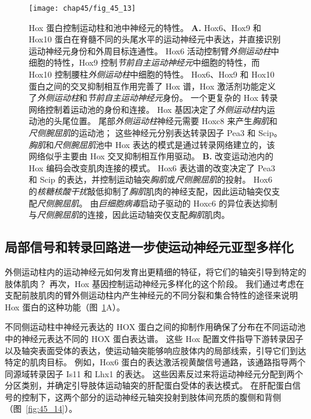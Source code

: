 \begin{figure}[htbp]
	\centering
	\texttt{[image: chap45/fig\_45\_13]}
	\caption{Hox 蛋白控制运动柱和池中神经元的特性\cite{dasen2005hox}。
		\textbf{A.} Hox6、Hox9 和 Hox10 蛋白在脊髓不同的头尾水平的运动神经元中表达，并直接识别运动神经元身份和外周目标连通性。
		Hox6 活动控制臂\textit{外侧运动柱}中细胞的特性，Hox9 控制\textit{节前自主运动神经元}中细胞的特性，而 Hox10 控制腰柱\textit{外侧运动柱}中细胞的特性。
		Hox6、Hox9 和 Hox10 蛋白之间的交叉抑制相互作用完善了 Hox 谱，Hox 激活剂功能定义了\textit{外侧运动柱}和\textit{节前自主运动神经元}身份。
		一个更复杂的 Hox 转录网络控制着运动池的身份和连接。
		Hox 基因决定了\textit{外侧运动柱}内运动池的头尾位置。
		尾部\textit{外侧运动柱}神经元需要 Hoxc8 来产生\textit{胸肌}和\textit{尺侧腕屈肌}的运动池；
		这些神经元分别表达转录因子 Pea3 和 Scip。
		\textit{胸肌}和\textit{尺侧腕屈肌}池中 Hox 表达的模式是通过转录网络建立的，该网络似乎主要由 Hox 交叉抑制相互作用驱动。
		\textbf{B.} 改变运动池内的 Hox 编码会改变肌肉连接的模式。
		Hox6 表达谱的改变决定了 Pea3 和 Scip 的表达，并控制运动轴突\textit{胸肌}或\textit{尺侧腕屈肌}的投射。
		Hox6 的\textit{核糖核酸干扰}敲低抑制了\textit{胸肌}肌肉的神经支配，因此运动轴突仅支配\textit{尺侧腕屈肌}。
		由\textit{巨细胞病毒}启动子驱动的 Hoxc6 的异位表达抑制与\textit{尺侧腕屈肌}的连接，因此运动轴突仅支配\textit{胸肌}肌肉。}
	\label{fig:45_13}
\end{figure}



\subsection{局部信号和转录回路进一步使运动神经元亚型多样化}

外侧运动柱内的运动神经元如何发育出更精细的特征，将它们的轴突引导到特定的肢体肌肉？
再次，Hox 基因控制运动神经元多样化的这个阶段。
我们通过考虑在支配前肢肌肉的臂外侧运动柱内产生神经元的不同分裂和集合特性的途径来说明 Hox 蛋白的这种功能（图~\ref{fig:45_13}A）。


不同侧运动柱中神经元表达的 HOX 蛋白之间的抑制作用确保了分布在不同运动池中的神经元表达不同的 HOX 蛋白表达谱。
这些 Hox 配置文件指导下游转录因子以及轴突表面受体的表达，使运动轴突能够响应肢体内的局部线索，引导它们到达特定的肌肉目标。
例如，Hox6 蛋白的表达激活视黄酸信号通路，该通路指导两个同源域转录因子 Is11 和 Lhx1 的表达。
这些因素反过来将运动神经元分配到两个分区类别，并确定引导肢体运动轴突的肝配蛋白受体的表达模式。
在肝配蛋白信号的控制下，这两个部分的运动神经元轴突投射到肢体间充质的腹侧和背侧（图~\ref{fig:45_14}）。


